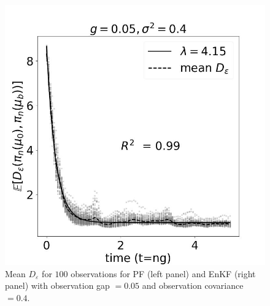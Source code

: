 {\begin{figure}
    \includegraphics[scale=0.3]{probing-nfs/plots/plots-enkf-100_enkf.jpg}
    \caption{Mean $D_\varepsilon$ for $100$ observations for PF (left panel) and EnKF (right panel) with observation gap  $=0.05$ and observation covariance $=0.4$.}
    \label{fig:obs-100--probing-nfs}
\end{figure}
}



